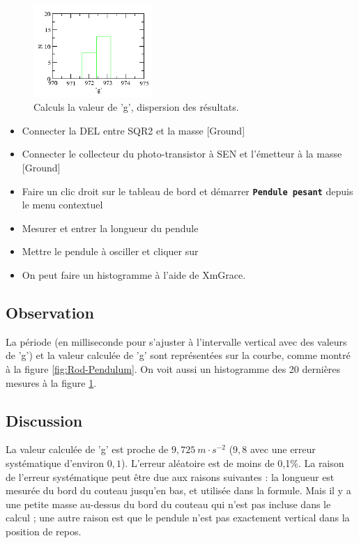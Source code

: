\documentclass{book}
\newcommand{\nop}{}
\begin{document}
\begin{figure}[h!]
\begin{center}
\caption{\label{fig:Rod-Pendulum2}Calculs la valeur de 'g', dispersion des résultats. }\vspace{0.5em}
\includegraphics[width=0.4\textwidth, height=0.3\textwidth, keepaspectratio]{Pic-rodpend-ghist.png}
\end{center}
\end{figure}



\begin{itemize}
  \item Connecter la DEL entre SQR2 et la masse [Ground]
  \item Connecter le collecteur du photo-transistor à SEN et l'émetteur à la masse [Ground]
  \item Faire un clic droit sur le tableau de bord et démarrer  \texttt{\textbf{Pendule pesant}\nop} depuis le menu contextuel
  \item Mesurer et entrer la longueur du pendule
  \item Mettre le pendule à osciller et cliquer sur  
  \item On peut faire un histogramme à l'aide de XmGrace.
\end{itemize}

\subsection{Observation}


La période (en milliseconde pour s'ajuster à l'intervalle vertical avec des valeurs de 'g') et la valeur calculée de 'g' sont représentées sur la courbe, comme montré à la figure  \ref{fig:Rod-Pendulum}. On voit aussi un histogramme des 20 dernières mesures à la figure  \ref{fig:Rod-Pendulum2}.

\subsection{Discussion}


La valeur calculée de 'g' est proche de $9,725\ m\cdot s^{-2}$  ($9,8$ avec une erreur systématique d'environ $0,1$). L'erreur aléatoire est de moins de 0,1\%{}. La raison de l'erreur systématique peut être due aux raisons suivantes : la longueur est mesurée du bord du couteau jusqu'en bas, et utilisée dans la formule. Mais il y a une petite masse au-dessus du bord du couteau qui n'est pas incluse dans le calcul ; une autre raison est que le pendule n'est pas exactement vertical dans la position de repos.
\end{document}
